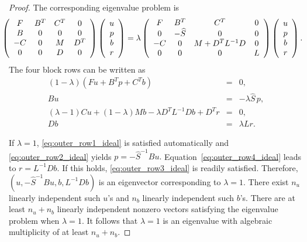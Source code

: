 \documentclass{siamltex}
\begin{document}
\begin{proof}
The corresponding eigenvalue problem is
 \begin{equation*}
 \hspace{-3mm}   %
\left(
\begin{array}{cccc}
F & B^T & C^T & 0\\
B & 0 & 0& 0\\
-C & 0& M & D^T\\
0 & 0 & D & 0
\end{array}
\right)
\left(
\begin{array}{c}
u\\
p\\
b\\
r
\end{array}
\right)
=
\lambda \left(
\begin{array}{cccc}
F & B^T &C^T & 0\\
0 & -\widehat{S} & 0 & 0\\
-C &0 & M+D^T L^{-1} D & 0\\
0 & 0 &  0 & L
\end{array}
\right)
\left(
\begin{array}{c}
u\\
p\\
b\\
r
\end{array}
\right).
\end{equation*}
The four block rows can be written as
\begin{eqnarray}
\label{eq:outer_row1_ideal} (1-\lambda) (Fu + B^T p+ C^T b) &=& 0,\\
\label{eq:outer_row2_ideal} B u &=& -\lambda \widehat{S}\, p,\\
\label{eq:outer_row3_ideal} (\lambda -1) C u + (1 - \lambda) M b - \lambda D^T L^{-1} D b + D^T r &=& 0,\\
\label{eq:outer_row4_ideal} D b &=& \lambda L r.
\end{eqnarray}

If $\lambda = 1$, \eqref{eq:outer_row1_ideal} is satisfied automatically and \eqref{eq:outer_row2_ideal} yields
$p = -\widehat{S}^{-1} B u.$
Equation~\eqref{eq:outer_row4_ideal} leads to $r = L^{-1} D b.$
If this holds, \eqref{eq:outer_row3_ideal} is readily satisfied.
Therefore, $(u, -\widehat{S}^{-1} B u, b, L^{-1} D b)$ is an eigenvector corresponding to $\lambda=1$. There exist $n_u$ linearly independent such $u$'s and $n_b$ linearly independent such $b$'s. There are at least $n_u+n_b$ linearly independent nonzero vectors satisfying the eigenvalue problem when $\lambda = 1$. It follows that $\lambda = 1$ is an eigenvalue with algebraic multiplicity of at least $n_u + n_b$.


\end{proof}
\end{document}

